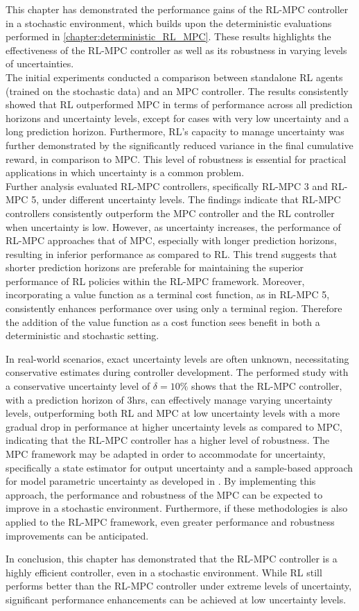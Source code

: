 This chapter has demonstrated the performance gains of the RL-MPC controller in a stochastic environment, which builds upon the deterministic evaluations performed in \autoref{chapter:deterministic_RL_MPC}. These results highlights the effectiveness of the RL-MPC controller as well as its robustness in varying levels of uncertainties.\\
The initial experiments conducted a comparison between standalone RL agents (trained on the stochastic data) and an MPC controller. The results consistently showed that RL outperformed MPC in terms of performance across all prediction horizons and uncertainty levels, except for cases with very low uncertainty and a long prediction horizon. Furthermore, RL's capacity to manage uncertainty was further demonstrated by the significantly reduced variance in the final cumulative reward, in comparison to MPC. This level of robustness is essential for practical applications in which uncertainty is a common problem.\\
Further analysis evaluated RL-MPC controllers, specifically RL-MPC 3 and RL-MPC 5, under different uncertainty levels. The findings indicate that RL-MPC controllers consistently outperform the MPC controller and the RL controller when uncertainty is low. However, as uncertainty increases, the performance of RL-MPC approaches that of MPC, especially with longer prediction horizons, resulting in inferior performance as compared to RL. This trend suggests that shorter prediction horizons are preferable for maintaining the superior performance of RL policies within the RL-MPC framework. Moreover, incorporating a value function as a terminal cost function, as in RL-MPC 5, consistently enhances performance over using only a terminal region. Therefore the addition of the value function as a cost function sees benefit in both a deterministic and stochastic setting. 

In real-world scenarios, exact uncertainty levels are often unknown, necessitating conservative estimates during controller development. The performed study with a conservative uncertainty level of $\delta = 10\%$ shows that the  RL-MPC controller, with a prediction horizon of 3hrs, can effectively manage varying uncertainty levels, outperforming both RL and MPC at low uncertainty levels with a more gradual drop in performance at higher uncertainty levels as compared to MPC, indicating that the RL-MPC controller has a higher level of robustness. The MPC framework may be adapted in order to accommodate for uncertainty, specifically a state estimator for output uncertainty and a sample-based approach for model parametric uncertainty  as developed in \cite{boersmaRobustSamplebasedModel2022}. By implementing this approach, the performance and robustness of the MPC can be expected to improve in a stochastic environment. Furthermore, if these methodologies is also applied to the RL-MPC framework, even greater performance and robustness improvements can be anticipated.

In conclusion, this chapter has demonstrated that the RL-MPC controller is a highly efficient controller, even in a stochastic environment. While RL still performs better than the RL-MPC controller under extreme levels of uncertainty, significant performance enhancements can be achieved at low uncertainty levels.
